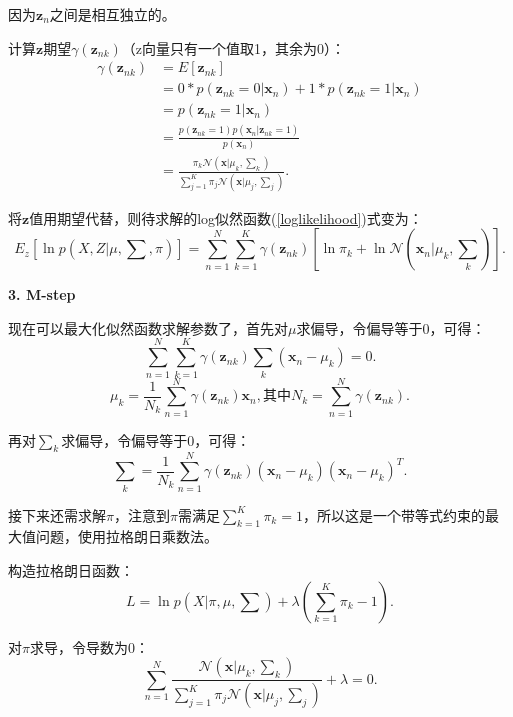 \documentclass[UTF8]{ctexart}
\begin{document}
因为${\mathbf z_n}$之间是相互独立的。

计算$\mathbf z$期望$\gamma(\mathbf z_{nk})$（z向量只有一个值取1，其余为0）：
\begin{equation}
  \begin{split}
    \gamma(\mathbf z_{nk}) &= E[\mathbf z_{nk}]\\
    &= 0*p(\mathbf z_{nk}=0|\mathbf x_n)+1*p(\mathbf z_{nk}=1|\mathbf x_n)\\
    &=p(\mathbf z_{nk}=1|\mathbf x_n)\\
    &=\frac{p(\mathbf z_{nk}=1)p(\mathbf x_n|\mathbf z_{nk}=1)}{p(\mathbf x_n)}\\
    &=\frac{\pi_k\mathcal N(\mathbf x|\mu_k,\sum_k)}{\sum_{j=1}^K\pi_j\mathcal N(\mathbf x|\mu_j,\sum_j)}.
  \end{split}
\end{equation}

将$\mathbf z$值用期望代替，则待求解的log似然函数(\ref{loglikelihood})式变为：
\begin{equation}
  E_z[\ln p(X,Z|\mu,\sum,\pi)] = \sum_{n=1}^N\sum_{k=1}^K\gamma (\mathbf z_{nk})[\ln\pi_k + \ln\mathcal N(\mathbf x_n|\mu_k,\sum_k)].
\end{equation}

\textbf{3. M-step}

现在可以最大化似然函数求解参数了，首先对$\mu$求偏导，令偏导等于0，可得：
\begin{equation}
  \sum_{n=1}^N\sum_{k=1}^K\gamma (\mathbf z_{nk})\sum_k(\mathbf x_n-\mu_k) = 0.
\end{equation}
\begin{equation}
  \mu_k = \frac{1}{N_k}\sum_{n=1}^N\gamma (\mathbf z_{nk}){\mathbf x_n},\text{其中}N_k = \sum_{n=1}^N\gamma (\mathbf z_{nk}).
\end{equation}

再对$\sum_k$求偏导，令偏导等于0，可得：
\begin{equation}
  \sum_k = \frac{1}{N_k}\sum_{n=1}^N\gamma (\mathbf z_{nk})(\mathbf x_n-\mu_k)(\mathbf x_n-\mu_k)^T.
\end{equation}

接下来还需求解$\pi$，注意到$\pi$需满足$\sum_{k=1}^K\pi_k=1$，所以这是一个带等式约束的最大值问题，使用拉格朗日乘数法。

构造拉格朗日函数：
\begin{equation}
  L=\ln p(X|\pi,\mu,\sum)+\lambda(\sum_{k=1}^K\pi_k-1).
\end{equation}

对$\pi$求导，令导数为0：
\begin{equation}
  \sum_{n=1}^N\frac{\mathcal N(\mathbf x|\mu_k,\sum_k)}{\sum_{j=1}^K\pi_j\mathcal N(\mathbf x|\mu_j,\sum_j)}+\lambda=0.
\end{equation}
\end{document}

